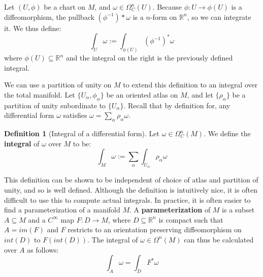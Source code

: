 \documentclass[11pt, oneside]{article}   	%
\theoremstyle{definition}
\newtheorem{definition}{Definition}[section]
\begin{document}
Let $(U, \phi)$ be a chart on $M$, and $\omega\in\Omega^n_C(U)$. Because $\phi : U\rightarrow\phi(U)$ is a 
diffeomorphism, the pullback $(\phi^{-1})*\omega$ is a $n$-form on $\mathbb R^n$, so we can integrate it. We thus define:
\begin{equation}
	\int_U\omega := \int_{\phi(U)}\left(\phi^{-1}\right)^*\omega
\end{equation}
where $\phi(U)\subseteq\mathbb R^n$ and the integral on the right is the previously defined integral. 

We can use a partition of unity on $M$ to extend this definition to an integral over the total manifold. Let $\{U_\alpha, 
\phi_\alpha\}$ be an oriented atlas on $M$, and let $\{\rho_\alpha\}$ be a partition of unity subordinate to $\{U_\alpha\}$. 
Recall that by definition for, any differential form $\omega$ satisfies $\omega = \sum_\alpha\rho_\alpha\omega$. 
\begin{definition}[Integral of a differential form]
Let $\omega\in\Omega^n_C(M)$. We define the \textbf{integral} of $\omega$ over $M$ to be:
\begin{equation}
	\int_M\omega := \sum_\alpha\int_{U_{\alpha}}\rho_\alpha\omega
\end{equation}
\end{definition}

This definition can be shown to be independent of choice of atlas and partition of unity, and so is well defined. Although 
the definition is intuitively nice, it is often difficult to use this to compute actual integrals. In practice, it is often 
easier to find a parameterization of a manifold $M$. A \textbf{parameterization} of $M$ is a subset $A\subseteq M$ and a 
$C^\infty$ map $F : D\rightarrow M$, where $D\subseteq\mathbb R^n$ is compact such that $A = im(F)$ and $F$ 
restricts to an orientation preserving diffeomorphism on $int(D)$ to $F(int(D))$. The integral of $\omega\in\Omega^n(M)$ 
can thus be calculated over $A$ as follows:
\begin{equation}
	\int_A\omega = \int_D F^*\omega
\end{equation}
\end{document}
